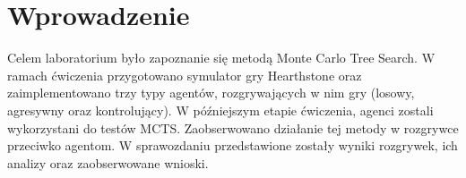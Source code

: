 \section{Wprowadzenie}

Celem laboratorium było zapoznanie się metodą Monte Carlo Tree Search. W ramach ćwiczenia przygotowano symulator gry Hearthstone oraz zaimplementowano trzy typy agentów, rozgrywających w nim gry (losowy, agresywny oraz kontrolujący). W późniejszym etapie ćwiczenia, agenci zostali wykorzystani do testów MCTS. Zaobserwowano działanie tej metody w rozgrywce przeciwko agentom. W sprawozdaniu przedstawione zostały wyniki rozgrywek, ich analizy oraz zaobserwowane wnioski.